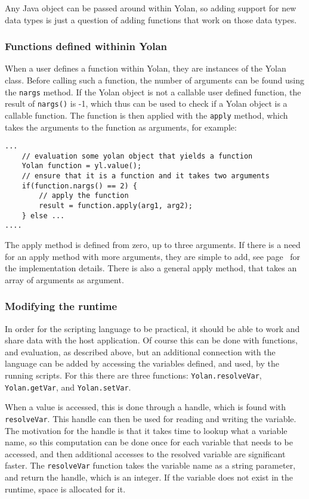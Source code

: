\documentclass[11pt]{report}
\begin{document}
Any Java object can be passed around within Yolan, so adding support for new data types is just a question of adding functions that work on those data types.

\subsubsection{Functions defined withinin Yolan}
When a user defines a function within Yolan, they are instances of the Yolan class. 
Before calling such a function, the number of arguments can be found using the \verb|nargs| method.
If the Yolan object is not a callable user defined function, the result of \verb|nargs()| is -1, which thus can be used to check if a Yolan object is a callable function.
The function is then applied with the \verb|apply| method, which takes the arguments to the function as arguments, for example:
\begin{lstlisting}
...
    // evaluation some yolan object that yields a function
    Yolan function = yl.value();
    // ensure that it is a function and it takes two arguments
    if(function.nargs() == 2) {
        // apply the function 
        result = function.apply(arg1, arg2);
    } else ...
....
\end{lstlisting}
The apply method is defined from zero, up to three arguments. If there is a need for an apply method with more arguments, they are simple to add, see page~\pageref{source-yolan-apply} for the implementation details. There is also a general apply method, that takes an array of arguments as argument.

\subsubsection{Modifying the runtime}

In order for the scripting language to be practical, it should be able to work and share data with the host application. 
Of course this can be done with functions, and evaluation, as described above, but an additional connection with the language can be added by accessing the variables defined, and used, by the running scripts.
For this there are three functions: \verb|Yolan.resolveVar|, \verb|Yolan.getVar|, and \verb|Yolan.setVar|.

When a value is accessed, this is done through a handle, which is found with \verb|resolveVar|. This handle can then be used for reading and writing the variable. The motivation for the handle is that it takes time to lookup what a variable name, so this computation can be done once for each variable that needs to be accessed, and then additional accesses to the resolved variable are significant faster. The \verb|resolveVar| function takes the variable name as a string parameter, and return the handle, which is an integer. If the variable does not exist in the runtime, space is allocated for it.
\end{document}
